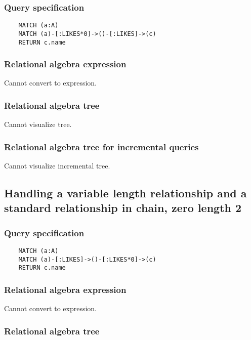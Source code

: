 	\subsubsection*{Query specification}

	\begin{lstlisting}
	MATCH (a:A)
	MATCH (a)-[:LIKES*0]->()-[:LIKES]->(c)
	RETURN c.name
	\end{lstlisting}


	\subsubsection*{Relational algebra expression}

	Cannot convert to expression.

	\subsubsection*{Relational algebra tree}

	Cannot visualize tree.

	\subsubsection*{Relational algebra tree for incremental queries}

	Cannot visualize incremental tree.
	\subsection{Handling a variable length relationship and a standard relationship in chain, zero length 2}

	\subsubsection*{Query specification}

	\begin{lstlisting}
	MATCH (a:A)
	MATCH (a)-[:LIKES]->()-[:LIKES*0]->(c)
	RETURN c.name
	\end{lstlisting}


	\subsubsection*{Relational algebra expression}

	Cannot convert to expression.

	\subsubsection*{Relational algebra tree}

